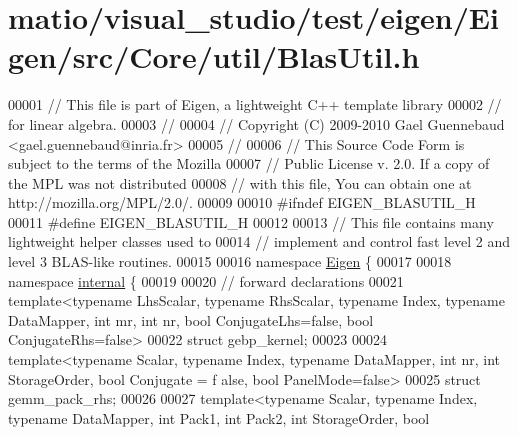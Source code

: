 \hypertarget{matio_2visual__studio_2test_2eigen_2_eigen_2src_2_core_2util_2_blas_util_8h_source}{}\section{matio/visual\+\_\+studio/test/eigen/\+Eigen/src/\+Core/util/\+Blas\+Util.h}
\label{matio_2visual__studio_2test_2eigen_2_eigen_2src_2_core_2util_2_blas_util_8h_source}

\begin{DoxyCode}
00001 \textcolor{comment}{// This file is part of Eigen, a lightweight C++ template library}
00002 \textcolor{comment}{// for linear algebra.}
00003 \textcolor{comment}{//}
00004 \textcolor{comment}{// Copyright (C) 2009-2010 Gael Guennebaud <gael.guennebaud@inria.fr>}
00005 \textcolor{comment}{//}
00006 \textcolor{comment}{// This Source Code Form is subject to the terms of the Mozilla}
00007 \textcolor{comment}{// Public License v. 2.0. If a copy of the MPL was not distributed}
00008 \textcolor{comment}{// with this file, You can obtain one at http://mozilla.org/MPL/2.0/.}
00009 
00010 \textcolor{preprocessor}{#ifndef EIGEN\_BLASUTIL\_H}
00011 \textcolor{preprocessor}{#define EIGEN\_BLASUTIL\_H}
00012 
00013 \textcolor{comment}{// This file contains many lightweight helper classes used to}
00014 \textcolor{comment}{// implement and control fast level 2 and level 3 BLAS-like routines.}
00015 
00016 \textcolor{keyword}{namespace }\hyperlink{namespace_eigen}{Eigen} \{
00017 
00018 \textcolor{keyword}{namespace }\hyperlink{namespaceinternal}{internal} \{
00019 
00020 \textcolor{comment}{// forward declarations}
00021 \textcolor{keyword}{template}<\textcolor{keyword}{typename} LhsScalar, \textcolor{keyword}{typename} RhsScalar, \textcolor{keyword}{typename} Index, \textcolor{keyword}{typename} DataMapper, \textcolor{keywordtype}{int} mr, \textcolor{keywordtype}{int} nr, \textcolor{keywordtype}{bool} 
      ConjugateLhs=false, \textcolor{keywordtype}{bool} ConjugateRhs=false>
00022 \textcolor{keyword}{struct }gebp\_kernel;
00023 
00024 \textcolor{keyword}{template}<\textcolor{keyword}{typename} Scalar, \textcolor{keyword}{typename} Index, \textcolor{keyword}{typename} DataMapper, \textcolor{keywordtype}{int} nr, \textcolor{keywordtype}{int} StorageOrder, \textcolor{keywordtype}{bool} Conjugate = f
      alse, \textcolor{keywordtype}{bool} PanelMode=false>
00025 \textcolor{keyword}{struct }gemm\_pack\_rhs;
00026 
00027 \textcolor{keyword}{template}<\textcolor{keyword}{typename} Scalar, \textcolor{keyword}{typename} Index, \textcolor{keyword}{typename} DataMapper, \textcolor{keywordtype}{int} Pack1, \textcolor{keywordtype}{int} Pack2, \textcolor{keywordtype}{int} StorageOrder, \textcolor{keywordtype}{bool}

\end{DoxyCode}
